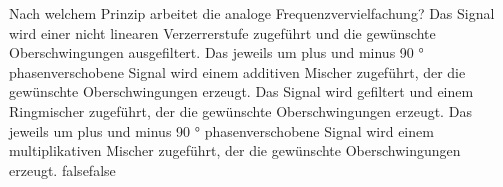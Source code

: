     {Nach welchem Prinzip arbeitet die analoge Frequenzvervielfachung?}
    {Das Signal wird einer nicht linearen Verzerrerstufe zugeführt und die gewünschte Oberschwingungen ausgefiltert.}
    {Das jeweils um plus und minus 90 ° phasenverschobene Signal wird einem additiven Mischer zugeführt, der die gewünschte Oberschwingungen erzeugt.}
    {Das Signal wird gefiltert und einem Ringmischer zugeführt, der die gewünschte Oberschwingungen erzeugt.}
    {Das jeweils um plus und minus 90 ° phasenverschobene Signal wird einem multiplikativen Mischer zugeführt, der die gewünschte Oberschwingungen erzeugt.}
    {false}{false}